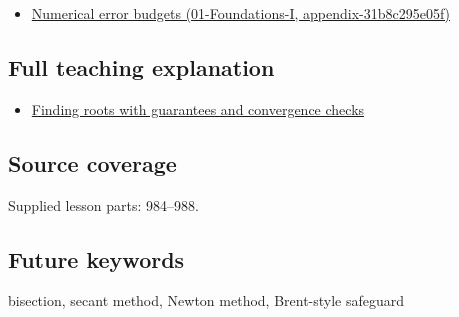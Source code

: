 \begin{itemize}
\tightlist
\item
  \href{}{Numerical error budgets (01-Foundations-I, appendix-31b8c295e05f)}
\end{itemize}

\subsection{Full teaching explanation}\label{full-teaching-explanation}

\begin{itemize}
\tightlist
\item
  \href{Continuous\%20Notes/Computing\%20Foundations\%20-\%20From\%20Bits\%20to\%20C++\%20and\%20Systems\%20APIs\#Finding\%20roots\%20with\%20guarantees\%20and\%20convergence\%20checks}{Finding roots with guarantees and convergence checks}
\end{itemize}

\subsection{Source coverage}\label{source-coverage}

Supplied lesson parts: 984--988.

\subsection{Future keywords}\label{future-keywords}

bisection, secant method, Newton method, Brent-style safeguard

